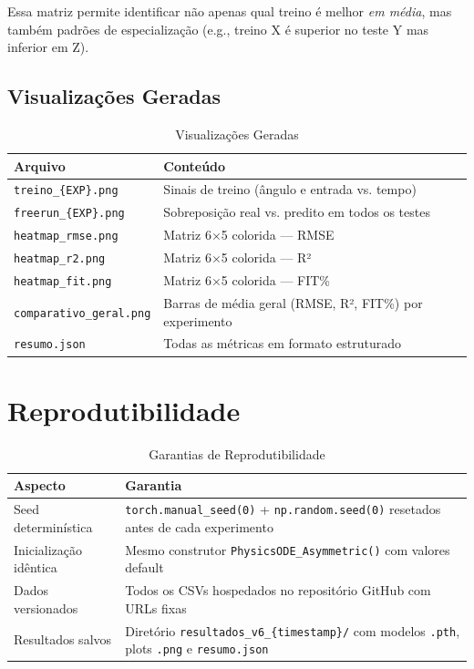 \documentclass[11pt,a4paper]{article}
\begin{document}
Essa matriz permite identificar não apenas qual treino é melhor \textit{em média}, mas também padrões de especialização (e.g., treino X é superior no teste Y mas inferior em Z).

\subsection{Visualizações Geradas}

\begin{table}[hbt!]
\centering
\caption{Visualizações Geradas}
\vspace{0.2cm}
\begin{tabular}{lp{10cm}}
\toprule
\textbf{Arquivo} & \textbf{Conteúdo} \\
\midrule
\texttt{treino\_\{EXP\}.png} & Sinais de treino (ângulo e entrada vs. tempo) \\
\texttt{freerun\_\{EXP\}.png} & Sobreposição real vs. predito em todos os testes \\
\texttt{heatmap\_rmse.png} & Matriz 6$\times$5 colorida — RMSE \\
\texttt{heatmap\_r2.png} & Matriz 6$\times$5 colorida — R² \\
\texttt{heatmap\_fit.png} & Matriz 6$\times$5 colorida — FIT\% \\
\texttt{comparativo\_geral.png} & Barras de média geral (RMSE, R², FIT\%) por experimento \\
\texttt{resumo.json} & Todas as métricas em formato estruturado \\
\bottomrule
\end{tabular}
\end{table}

\section{Reprodutibilidade}

\begin{table}[hbt!]
\centering
\caption{Garantias de Reprodutibilidade}
\vspace{0.2cm}
\begin{tabular}{lp{11cm}}
\toprule
\textbf{Aspecto} & \textbf{Garantia} \\
\midrule
Seed determinística & \texttt{torch.manual\_seed(0)} + \texttt{np.random.seed(0)} resetados antes de cada experimento \\
Inicialização idêntica & Mesmo construtor \texttt{PhysicsODE\_Asymmetric()} com valores default \\
Dados versionados & Todos os CSVs hospedados no repositório GitHub com URLs fixas \\
Resultados salvos & Diretório \texttt{resultados\_v6\_\{timestamp\}/} com modelos \texttt{.pth}, plots \texttt{.png} e \texttt{resumo.json} \\
\bottomrule
\end{tabular}
\end{table}
\end{document}
